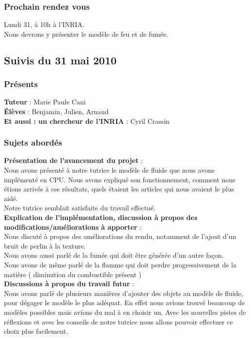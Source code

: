 \documentclass[a4paper,10pt]{article}
\begin{document}
\subsubsection{Prochain rendez vous}
Lundi 31, à 10h à l'INRIA.\\
Nous devrons y présenter le modèle de feu et de fumée.



\subsection{Suivis du  31 mai 2010}
\subsubsection{Présents}
\textbf{Tuteur} : Marie Paule Cani\\
\textbf{Élèves} : Benjamin, Julien, Arnaud \\
\textbf{Et aussi : un chercheur de l'INRIA} : Cyril Crassin \\

\subsubsection{Sujets abordés}
\textbf{Présentation de l'avancement du projet} :  \\
    Nous avons présenté à notre tutrice le modèle de fluide que nous avons implémenté en CPU.
    Nous avons expliqué son fonctionnement, comment nous étions arrivés à ces résultats, 
    quels étaient les articles qui nous avaient le plus aidé.\\
    Notre tutrice semblait satisfaite du travail effectué.\\
    
\textbf{Explication de l'implémentation, discussion à propos des modifications/améliorations à apporter} :  \\
    Nous discuté à propos des améliorations du rendu, notamment de l'ajout d'un bruit de perlin à la texture.\\
    Nous avons aussi parlé de la fumée qui doit être générée d'un autre façon.\\
    Nous avons de même parlé de la flamme qui doit perdre progressivement de la matière ( diminution du combustible présent )\\
    
\textbf{Discussions à propos du travail futur} :  \\
    Nous avons parlé de plusieurs manières d'ajouter des objets au modèle de fluide, 
    pour dégager le modèle le plus adéquat. En effet nous avions trouvé beaucoup de modèles 
    possibles mais avions du mal à en choisir un. Avec les nouvelles pistes de 
    réflexions et avec les conseils de notre tutrice nous allons pouvoir effectuer
    ce choix plus facilement.\\
    
\end{document}
